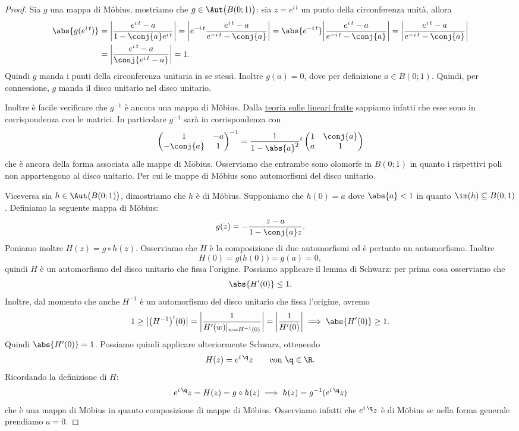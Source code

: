 \begin{proof}
	Sia \(g\) una mappa di M\"obius, mostriamo che \(g\in \Aut\big(B(0;1)\big)\):
	sia \(z=e^{i\,t}\) un punto della circonferenza unità, allora
	\[
		\begin{split}
			\abs{g(e^{i\,t})} & = \bigg\lvert \frac{e^{i\,t}-a}{1-\conj{a}e^{i\,t}} \bigg\rvert = \bigg\lvert e^{-i\,t} \frac{e^{i\,t}-a}{e^{-i\,t}-\conj{a}} \bigg\rvert = \abs{e^{-i\,t}} \bigg\lvert \frac{e^{i\,t}-a}{e^{-i\,t}-\conj{a}} \bigg\rvert = \bigg\lvert \frac{e^{i\,t}-a}{e^{-i\,t}-\conj{a}} \bigg\rvert\\
			& = \bigg\lvert \frac{e^{i\,t}-a}{\conj{e^{i\,t}-a}} \bigg\rvert = 1.
		\end{split}
	\]
	Quindi \(g\) manda i punti della circonferenza unitaria in se stessi. Inoltre \(g(a)=0\), dove per definizione \(a\in B(0;1)\). Quindi, per connessione, \(g\) manda il disco unitario nel disco unitario.
	
	Inoltre è facile verificare che \(g^{-1}\) è ancora una mappa di M\"obius. Dalla \hyperref[df:trasformazioneLineareFratta]{teoria sulle lineari fratte} sappiamo infatti che esse sono in corrispondenza con le matrici. In particolare \(g^{-1}\) sarà in corrispondenza con
	\[
		\begin{pmatrix}
			1         & -a \\
			-\conj{a} & 1
		\end{pmatrix}^{-1}
		= \frac{1}{1-\abs{a}^2}
		{}^t\begin{pmatrix}
			1 & \conj{a} \\
			a & 1
		\end{pmatrix}
	\]
	che è ancora della forma associata alle mappe di M\"obius. Osserviamo che entrambe sono olomorfe in \(B(0;1)\) in quanto i rispettivi poli non appartengono al disco unitario. Per cui le mappe di M\"obius sono automorfismi del disco unitario.
	
	Viceversa sia \(h\in \Aut\big(B(0;1)\big)\), dimostriamo che \(h\) è di M\"obius. Supponiamo che \(h(0)=a\) dove \(\abs{a}<1\) in quanto \(\im(h)\subseteq B(0;1)\). Definiamo la seguente mappa di M\"obius:
	\[
		g(z) = - \frac{z-a}{1-\conj{a}z}.
	\]
	Poniamo inoltre \(H(z)=g\circ h(z)\). Osserviamo che \(H\) è la composizione di due automorfismi ed è pertanto un automorfismo. Inoltre
	\[
		H(0) = g\big(h(0)\big) = g(a) = 0,
	\]
	quindi \(H\) è un automorfismo del disco unitario che fissa l'origine. Possiamo applicare il lemma di Schwarz: per prima cosa osserviamo che
	\[
		\abs{H'(0)} \le 1.
	\]
	Inoltre, dal momento che anche \(H^{-1}\) è un automorfismo del disco unitario che fissa l'origine, avremo
	\[
		1 \ge \big\lvert \big(H^{-1}\big)'(0)\big\rvert = \bigg\lvert \frac{1}{H'(w)|_{w=H^{-1}(0)}} \bigg\rvert = \bigg\lvert \frac{1}{H'(0)} \bigg\rvert \implies \abs{H'(0)} \ge 1.
	\]
	Quindi \(\abs{H'(0)} = 1\). Possiamo quindi applicare ulteriormente Schwarz, ottenendo
	\[
		H(z) = e^{i\,\q}z \qquad\text{con }\q\in\R.
	\]
	Ricordando la definizione di \(H\):
	\[
		e^{i\,\q}z = H(z) = g\circ h(z) \implies h(z) = g^{-1}(e^{i\,\q}z)
	\]
	che è una mappa di M\"obius in quanto composizione di mappe di M\"obius.
	Osserviamo infatti che \(e^{i\,\q}z\) è di M\"obius se nella forma generale prendiamo \(a=0\).
\end{proof}
